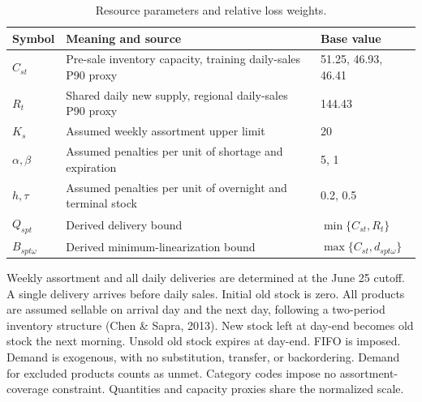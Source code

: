 \documentclass[11pt,letterpaper]{article}
\begin{document}
\begin{table}[H]\centering
\caption{Resource parameters and relative loss weights.}
\begin{tabularx}{\linewidth}{lXl}\toprule
Symbol & Meaning and source & Base value\\\midrule
$C_{st}$ & Pre-sale inventory capacity, training daily-sales P90 proxy
& 51.25, 46.93, 46.41\\
$R_t$ & Shared daily new supply, regional daily-sales P90 proxy & 144.43\\
$K_s$ & Assumed weekly assortment upper limit & 20\\
$\alpha,\beta$ & Assumed penalties per unit of shortage and expiration & 5, 1\\
$h,\tau$ & Assumed penalties per unit of overnight and terminal stock & 0.2, 0.5\\
$Q_{spt}$ & Derived delivery bound & $\min\{C_{st},R_t\}$\\
$B_{spt\omega}$ & Derived minimum-linearization bound & $\max\{C_{st},d_{spt\omega}\}$\\\bottomrule
\end{tabularx}\end{table}

Weekly assortment and all daily deliveries are determined at the June 25
cutoff. A single delivery arrives before daily sales. Initial old stock
is zero. All products are assumed sellable on arrival day and the next
day, following a two-period inventory structure (Chen \& Sapra, 2013).
New stock left at day-end becomes old stock the next morning. Unsold
old stock expires at day-end. FIFO is imposed. Demand is exogenous,
with no substitution, transfer, or backordering. Demand for excluded
products counts as unmet. Category codes impose no assortment-coverage
constraint. Quantities and capacity proxies share the normalized scale.
\end{document}

